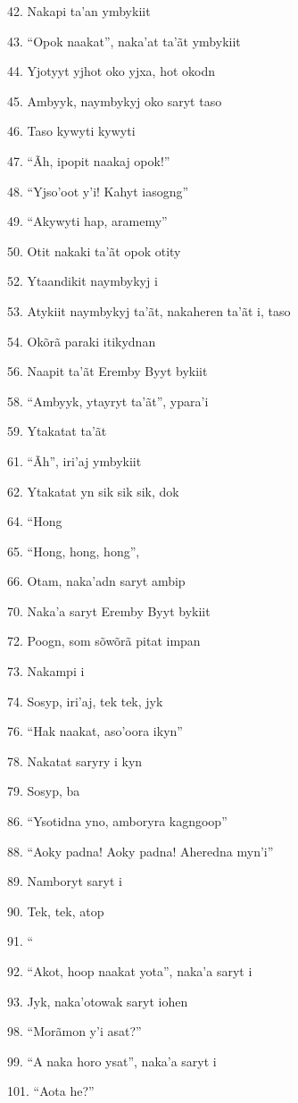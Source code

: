 42. Nakapi ta'an ymbykiit

43. ``Opok naakat'', naka'at ta'ãt ymbykiit

44. Yjotyyt yjhot oko yjxa, hot okodn

45. Ambyyk, naymbykyj oko saryt taso

46. Taso kywyti kywyti

47. ``Ãh, ipopit naakaj opok!''

48. ``Yjso'oot y'i! Kahyt iasogng''

49. ``Akywyti hap, aramemy''

50. Otit nakaki ta'ãt opok otity

52. Ytaandikit naymbykyj i

53. Atykiit naymbykyj ta'ãt, nakaheren ta'ãt i, taso

54. Okõrã paraki itikydnan

56. Naapit ta'ãt Eremby Byyt bykiit

58. ``Ambyyk, ytayryt ta'ãt'', ypara'i

59. Ytakatat ta'ãt

61. ``Ãh'', iri'aj ymbykiit

62. Ytakatat yn sik sik sik, dok

64. ``Hong

65. ``Hong, hong, hong'',

66. Otam, naka'adn saryt ambip

70. Naka'a saryt Eremby Byyt bykiit

72. Poogn, som sõwõrã pitat impan

73. Nakampi i

74. Sosyp, iri'aj, tek tek, jyk

76. ``Hak naakat, aso'oora ikyn''

78. Nakatat saryry i kyn

79. Sosyp, ba

86. ``Ysotidna yno, amboryra kagngoop''

88. ``Aoky padna! Aoky padna! Aheredna myn'i''

89. Namboryt saryt i

90. Tek, tek, atop

91. ``

92. ``Akot, hoop naakat yota'', naka'a saryt i

93. Jyk, naka'otowak saryt iohen

98. ``Morãmon y'i asat?''

99. ``A naka horo ysat'', naka'a saryt i

101. ``Aota he?''

